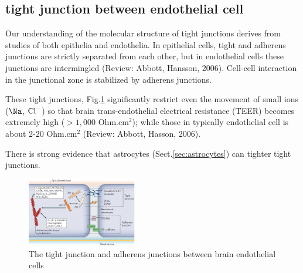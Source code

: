 \subsection{tight junction between endothelial cell}

Our understanding of the molecular structure of tight junctions derives from
studies of both epithelia and endothelia.
In epithelial cells, tight and adherens junctions are strictly separated from
each other, but in endothelial cells these junctions are intermingled (Review:
Abbott, Hansson, 2006). Cell-cell interaction in the junctional zone is
stabilized by adherens junctions.

\begin{mdframed}

These tight junctions, Fig.\ref{fig:tight-junction-brain-endothelial-cell}
significantly restrict even the movement of small ions ($\Na$, ${\text{Cl}^{-}}$) so that
brain trans-endothelial electrical resistance (TEER) becomes extremely high
($>1,000$ Ohm.cm$^2$); while those in typically endothelial cell is about 2-20
Ohm.cm$^2$ (Review: Abbott, Hasson, 2006).

There is strong evidence that astrocytes (Sect.\ref{sec:astrocytes}) can tighter
tight junctions.
\end{mdframed}



\begin{figure}[hbt]
  \centerline{\includegraphics[height=3cm,
    angle=0]{./images/tight-junction-brain-endothelial-cell.eps}}
\caption{The tight junction and adherens junctions between brain endothelial
cells}
\label{fig:tight-junction-brain-endothelial-cell}
\end{figure}



